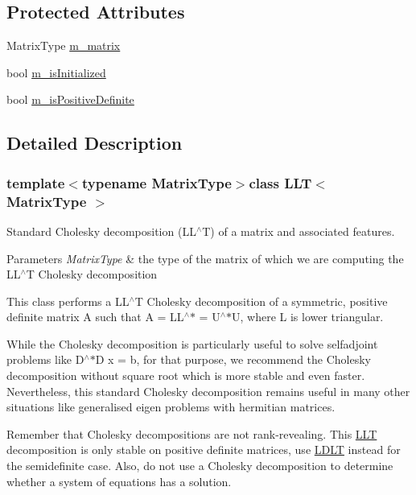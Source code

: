 \subsection*{Protected Attributes}
\begin{DoxyCompactItemize}
\item 
Matrix\-Type \hyperlink{class_l_l_t_a5750c879b44118e0d497b84c578a2c89}{m\-\_\-matrix}
\item 
bool \hyperlink{class_l_l_t_a538a8165865c01777995af8f30e9778a}{m\-\_\-is\-Initialized}
\item 
bool \hyperlink{class_l_l_t_a8e208b8ab05b525407b50a4047aaae73}{m\-\_\-is\-Positive\-Definite}
\end{DoxyCompactItemize}


\subsection{Detailed Description}
\subsubsection*{template$<$typename Matrix\-Type$>$class L\-L\-T$<$ Matrix\-Type $>$}

Standard Cholesky decomposition (L\-L$^\wedge$\-T) of a matrix and associated features. 


\begin{DoxyParams}{Parameters}
{\em Matrix\-Type} & the type of the matrix of which we are computing the L\-L$^\wedge$\-T Cholesky decomposition\\
\hline
\end{DoxyParams}
This class performs a L\-L$^\wedge$\-T Cholesky decomposition of a symmetric, positive definite matrix A such that A = L\-L$^\wedge$$\ast$ = U$^\wedge$$\ast$\-U, where L is lower triangular.

While the Cholesky decomposition is particularly useful to solve selfadjoint problems like D$^\wedge$$\ast$\-D x = b, for that purpose, we recommend the Cholesky decomposition without square root which is more stable and even faster. Nevertheless, this standard Cholesky decomposition remains useful in many other situations like generalised eigen problems with hermitian matrices.

Remember that Cholesky decompositions are not rank-\/revealing. This \hyperlink{class_l_l_t}{L\-L\-T} decomposition is only stable on positive definite matrices, use \hyperlink{class_l_d_l_t}{L\-D\-L\-T} instead for the semidefinite case. Also, do not use a Cholesky decomposition to determine whether a system of equations has a solution.

